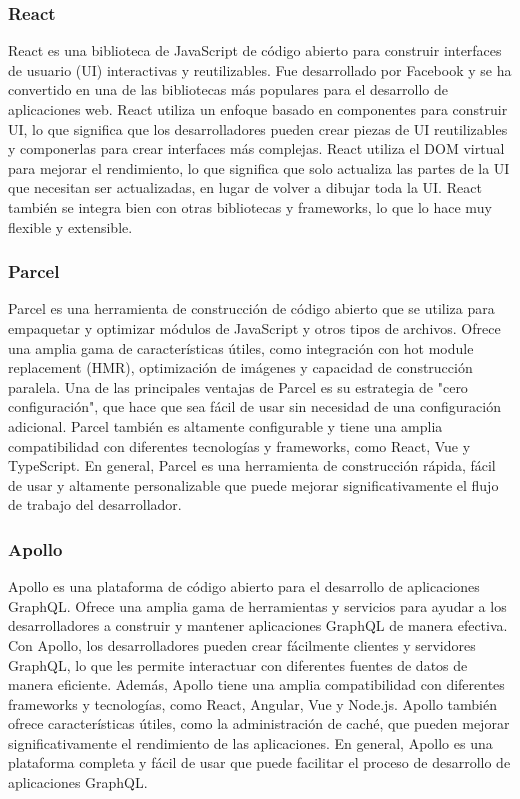 \newpage
\subsubsection{React}

React es una biblioteca de JavaScript de código abierto para construir interfaces de usuario (UI) interactivas y reutilizables. Fue desarrollado por Facebook y se ha convertido en una de las bibliotecas más populares para el desarrollo de aplicaciones web. React utiliza un enfoque basado en componentes para construir UI, lo que significa que los desarrolladores pueden crear piezas de UI reutilizables y componerlas para crear interfaces más complejas. React utiliza el DOM virtual para mejorar el rendimiento, lo que significa que solo actualiza las partes de la UI que necesitan ser actualizadas, en lugar de volver a dibujar toda la UI. React también se integra bien con otras bibliotecas y frameworks, lo que lo hace muy flexible y extensible.


\subsubsection{Parcel}

Parcel es una herramienta de construcción de código abierto que se utiliza para empaquetar y optimizar módulos de JavaScript y otros tipos de archivos. Ofrece una amplia gama de características útiles, como integración con hot module replacement (HMR), optimización de imágenes y capacidad de construcción paralela. Una de las principales ventajas de Parcel es su estrategia de "cero configuración", que hace que sea fácil de usar sin necesidad de una configuración adicional. Parcel también es altamente configurable y tiene una amplia compatibilidad con diferentes tecnologías y frameworks, como React, Vue y TypeScript. En general, Parcel es una herramienta de construcción rápida, fácil de usar y altamente personalizable que puede mejorar significativamente el flujo de trabajo del desarrollador.


\newpage
\subsubsection{Apollo}

Apollo es una plataforma de código abierto para el desarrollo de aplicaciones GraphQL. Ofrece una amplia gama de herramientas y servicios para ayudar a los desarrolladores a construir y mantener aplicaciones GraphQL de manera efectiva. Con Apollo, los desarrolladores pueden crear fácilmente clientes y servidores GraphQL, lo que les permite interactuar con diferentes fuentes de datos de manera eficiente. Además, Apollo tiene una amplia compatibilidad con diferentes frameworks y tecnologías, como React, Angular, Vue y Node.js. Apollo también ofrece características útiles, como la administración de caché, que pueden mejorar significativamente el rendimiento de las aplicaciones. En general, Apollo es una plataforma completa y fácil de usar que puede facilitar el proceso de desarrollo de aplicaciones GraphQL.



